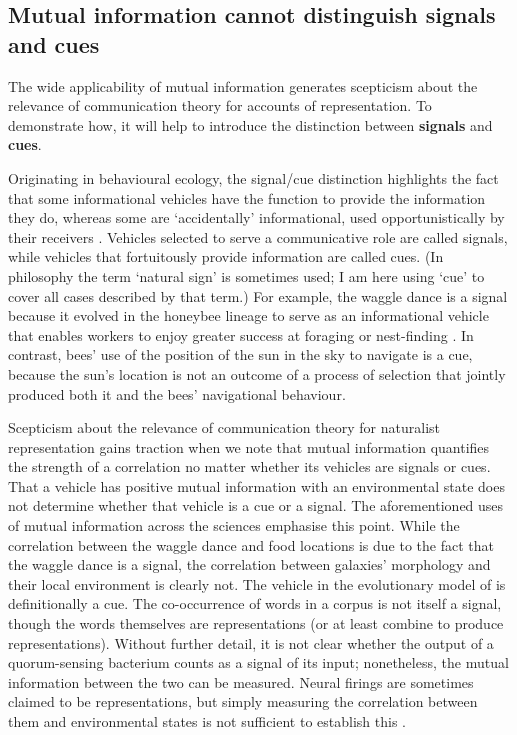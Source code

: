 \subsection{Mutual information cannot distinguish signals and cues}

The wide applicability of mutual information generates scepticism about the relevance of communication theory for accounts of representation.
To demonstrate how, it will help to introduce the distinction between \textbf{signals} and \textbf{cues}.

Originating in behavioural ecology, the signal/cue distinction highlights the fact that some informational vehicles have the function to provide the information they do, whereas some are `accidentally' informational, used opportunistically by their receivers \citep[$\S$1.2]{maynardsmith2003animal}.
Vehicles selected to serve a communicative role are called signals, while vehicles that fortuitously provide information are called cues.
(In philosophy the term `natural sign' is sometimes used; I am here using `cue' to cover all cases described by that term.)
For example, the waggle dance is a signal because it evolved in the honeybee lineage to serve as an informational vehicle that enables workers to enjoy greater success at foraging or nest-finding \citep{gould1975honey,riley2005flight}.
In contrast, bees' use of the position of the sun in the sky to navigate is a cue, because the sun's location is not an outcome of a process of selection that jointly produced both it and the bees' navigational behaviour.

Scepticism about the relevance of communication theory for naturalist representation gains traction when we note that mutual information quantifies the strength of a correlation no matter whether its vehicles are signals or cues.
That a vehicle has positive mutual information with an environmental state does not determine whether that vehicle is a cue or a signal.
The aforementioned uses of mutual information across the sciences emphasise this point.
While the correlation between the waggle dance and food locations is due to the fact that the waggle dance is a signal, the correlation between galaxies' morphology and their local environment is clearly not.
The vehicle in the evolutionary model of \citet{donaldson-matasci2010fitness} is definitionally a cue.
The co-occurrence of words in a corpus is not itself a signal, though the words themselves are representations (or at least combine to produce representations).
Without further detail, it is not clear whether the output of a quorum-sensing bacterium counts as a signal of its input; nonetheless, the mutual information between the two can be measured.
Neural firings are sometimes claimed to be representations, but simply measuring the correlation between them and environmental states is not sufficient to establish this \citep{rathkopf2017neural}.

